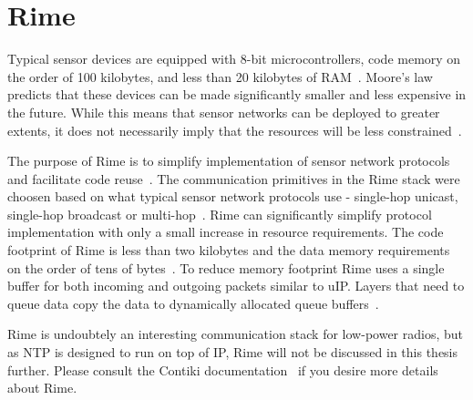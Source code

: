 
\section{Rime}\label{sec:contiki-rime}
Typical sensor devices are equipped with 8-bit microcontrollers,
code memory on the order of 100 kilobytes, and less than
20 kilobytes of RAM~\cite{paper-contiki}.
Moore's law predicts that these devices
can be made significantly smaller and less expensive
in the future. While this means that sensor networks can
be deployed to greater extents, it does not necessarily imply
that the resources will be less constrained~\cite{paper-contiki}.

The purpose of Rime is to simplify implementation of
sensor network protocols and facilitate code reuse~\cite{paper-rime}. 
The communication primitives in the Rime stack were choosen
based on what typical sensor network protocols use -
single-hop unicast, single-hop broadcast or multi-hop~\cite{contiki-docs,paper-rime}.
Rime can significantly simplify protocol implementation
with only a small increase in resource requirements.
The code footprint of Rime is less than two kilobytes and the
data memory requirements on the order of tens of bytes~\cite{paper-rime}.
To reduce memory footprint Rime uses a single buffer for
both incoming and outgoing packets similar to uIP. Layers
that need to queue data copy the data to dynamically
allocated queue buffers~\cite{paper-rime}.

Rime is undoubtely an interesting communication stack for low-power radios,
but as NTP is designed to run on top of IP, Rime will not be discussed
in this thesis further.
Please consult the Contiki documentation~\cite{contiki-docs} if you desire
more details about Rime.
